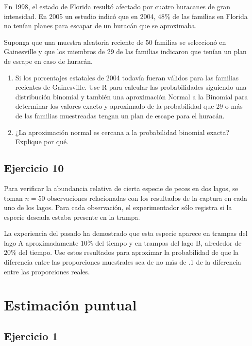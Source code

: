 \documentclass[
]{article}
\begin{document}
En 1998, el estado de Florida resultó afectado por cuatro huracanes de gran intensidad. En 2005 un estudio indicó que en 2004, \(48 \%\) de las familias en Florida no tenían planes para escapar de un huracán que se aproximaba.

Suponga que una muestra aleatoria reciente de 50 familias se seleccionó en Gainesville y que los miembros de 29 de las familias indicaron que tenían un plan de escape en caso de huracán.

\begin{enumerate}
\def\labelenumi{\alph{enumi}.}
\item
  Si los porcentajes estatales de 2004 todavía fueran válidos para las familias recientes de Gainesville. Use R para calcular las probabilidades siguiendo una distribución binomial y también una aproximación Normal a la Binomial para determinar los valores exacto y aproximado de la probabilidad que 29 o más de las familias muestreadas tengan un plan de escape para el huracán.
\item
  ¿La aproximación normal es cercana a la probabilidad binomial exacta? Explique por qué.
\end{enumerate}

\subsection{Ejercicio 10}\label{ejercicio-10}

Para verificar la abundancia relativa de cierta especie de peces en dos lagos, se toman \(n=50\) observaciones relacionadas con los resultados de la captura en cada uno de los lagos. Para cada observación, el experimentador sólo registra si la especie deseada estaba presente en la trampa.

La experiencia del pasado ha demostrado que esta especie aparece en trampas del lago A aproximadamente \(10 \%\) del tiempo y en trampas del lago B, alrededor de \(20 \%\) del tiempo. Use estos resultados para aproximar la probabilidad de que la diferencia entre las proporciones muestrales sea de no más de .1 de la diferencia entre las proporciones reales.

\section{Estimación puntual}\label{estimaciuxf3n-puntual}

\subsection{Ejercicio 1}\label{ejercicio-1-2}
\end{document}

